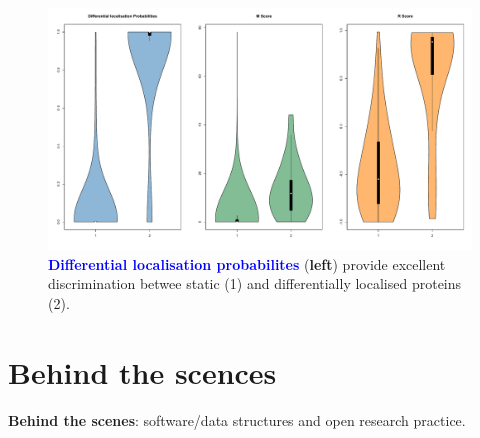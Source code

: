 \documentclass{beamer}
\theoremstyle{example}
\begin{document}
\begin{frame}
  \begin{figure}[h]
    \centering
    \includegraphics[width=\linewidth]{./figs/vioplotInformative.pdf}
    \caption{\textbf{\textcolor{Blue}{Differential localisation
          probabilites}} (\textbf{left}) provide excellent
      discrimination betwee static (1) and differentially localised
      proteins (2).}
  \end{figure}
\end{frame}



\section{Behind the scences}


\begin{frame}{}
  \begin{center}
    \Large{\textbf{Behind the scenes}: software/data structures and
      open research practice.}
  \end{center}
\end{frame}
\end{document}

